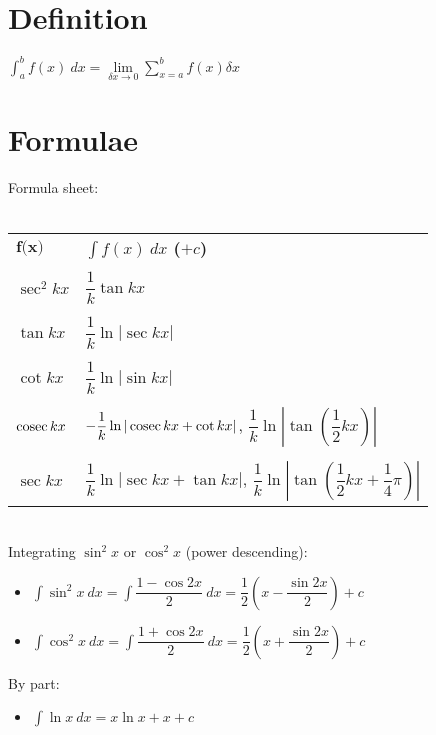 \section{Definition}
$\int_{a}^{b} f(x) \: dx = \lim\limits_{\delta x\rightarrow0}\sum_{x=a}^{b}f(x)\delta x$

\section{Formulae}
Formula sheet:\\\\
\begin{tabular}{ll}
    $\textbf{f(x)}$ & \textbf{$\int f(x) \: dx$ ($+c$)}                                                                  \\&\\
    $\sec^2kx$      & $\dfrac{1}{k} \tan kx$                                                                             \\&\\
    $\tan kx$       & $\dfrac{1}{k} \ln |\sec kx|$                                                                       \\&\\
    $\cot kx$       & $\dfrac{1}{k} \ln |\sin kx|$                                                                       \\&\\
    $\operatorname{cosec} kx$     & $-\dfrac{1}{k} \ln |\operatorname{cosec} kx + \cot kx|$, $\dfrac{1}{k} \ln \left|\tan (\dfrac{1}{2}kx)\right|$              \\&\\
    $\sec kx$       & $\dfrac{1}{k} \ln |\sec kx + \tan kx|$, $\dfrac{1}{k} \ln \left|\tan (\dfrac{1}{2}kx+\dfrac{1}{4}\pi)\right|$ \\
\end{tabular}\\
Integrating $\sin^2x$ or $\cos^2x$ (power descending):
\begin{itemize}
    \item $\int \sin ^2 x \: dx=\int \dfrac{1-\cos 2x}{2} \: dx=\dfrac{1}{2}\left(x-\dfrac{\sin 2x}{2}\right)+c$
    \item $\int \cos ^2 x \: dx=\int \dfrac{1+\cos 2x}{2} \: dx= \dfrac{1}{2}\left(x+\dfrac{\sin 2x}{2}\right)+c$
\end{itemize}
By part:
\begin{itemize}
    \item $\int \ln x \: dx = x\ln x + x + c$
\end{itemize}
